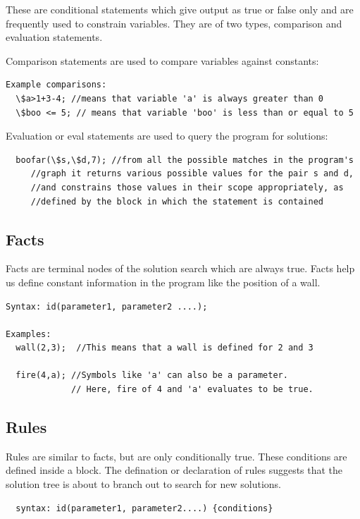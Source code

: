 \documentclass[onecolumn,titlepage]{article}
\begin{document}
These are conditional statements which give output as true or false
only and are frequently used to constrain variables. They are of two
types, comparison and evaluation statements.

Comparison statements are used to compare variables against constants:

\begin{verbatim}
Example comparisons:
  \$a>1+3-4; //means that variable 'a' is always greater than 0
  \$boo <= 5; // means that variable 'boo' is less than or equal to 5
\end{verbatim}

Evaluation or eval statements are used to query the program for solutions:

\begin{verbatim}
  boofar(\$s,\$d,7); //from all the possible matches in the program's
     //graph it returns various possible values for the pair s and d,
     //and constrains those values in their scope appropriately, as 
     //defined by the block in which the statement is contained
\end{verbatim}

\subsection{Facts}

Facts are terminal nodes of the solution search which are always
true. Facts help us define constant information in the program like
the position of a wall.

\begin{verbatim}
Syntax: id(parameter1, parameter2 ....);

Examples:
  wall(2,3);  //This means that a wall is defined for 2 and 3

  fire(4,a); //Symbols like 'a' can also be a parameter.
             // Here, fire of 4 and 'a' evaluates to be true.
\end{verbatim}


\subsection{Rules}
Rules are similar to facts, but are only conditionally true. These
conditions are defined inside a block. The defination or declaration
of rules suggests that the solution tree is about to branch out to
search for new solutions.


\begin{verbatim}
  syntax: id(parameter1, parameter2....) {conditions}
\end{verbatim}
\end{document}
